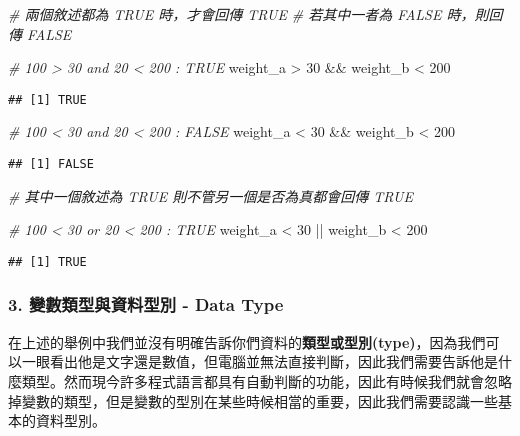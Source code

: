 \documentclass[]{article}
\newenvironment{Shaded}{\begin{snugshade}}{\end{snugshade}}
\newcommand{\DecValTok}[1]{\textcolor[rgb]{0.00,0.00,0.81}{{#1}}}
\newcommand{\StringTok}[1]{\textcolor[rgb]{0.31,0.60,0.02}{{#1}}}
\newcommand{\CommentTok}[1]{\textcolor[rgb]{0.56,0.35,0.01}{\textit{{#1}}}}
\newcommand{\NormalTok}[1]{{#1}}
\begin{document}
\begin{Shaded}
\begin{Highlighting}[]
\CommentTok{# 兩個敘述都為 TRUE 時，才會回傳 TRUE}
\CommentTok{# 若其中一者為 FALSE 時，則回傳 FALSE}

\CommentTok{# 100 > 30 and 20 < 200 : TRUE}
\NormalTok{weight_a >}\StringTok{ }\DecValTok{30} \NormalTok{&&}\StringTok{ }\NormalTok{weight_b <}\StringTok{ }\DecValTok{200}
\end{Highlighting}
\end{Shaded}

\begin{verbatim}
## [1] TRUE
\end{verbatim}

\begin{Shaded}
\begin{Highlighting}[]
\CommentTok{# 100 < 30 and 20 < 200 : FALSE}
\NormalTok{weight_a <}\StringTok{ }\DecValTok{30} \NormalTok{&&}\StringTok{ }\NormalTok{weight_b <}\StringTok{ }\DecValTok{200}
\end{Highlighting}
\end{Shaded}

\begin{verbatim}
## [1] FALSE
\end{verbatim}

\begin{Shaded}
\begin{Highlighting}[]
\CommentTok{# 其中一個敘述為 TRUE 則不管另一個是否為真都會回傳 TRUE}

\CommentTok{# 100 < 30 or 20 < 200 : TRUE}
\NormalTok{weight_a <}\StringTok{ }\DecValTok{30} \NormalTok{||}\StringTok{ }\NormalTok{weight_b <}\StringTok{ }\DecValTok{200}
\end{Highlighting}
\end{Shaded}

\begin{verbatim}
## [1] TRUE
\end{verbatim}

\subsubsection{3. 變數類型與資料型別 - Data Type}\label{---data-type}

在上述的舉例中我們並沒有明確告訴你們資料的\textbf{類型或型別(type)}，因為我們可以一眼看出他是文字還是數值，但電腦並無法直接判斷，因此我們需要告訴他是什麼類型。然而現今許多程式語言都具有自動判斷的功能，因此有時候我們就會忽略掉變數的類型，但是變數的型別在某些時候相當的重要，因此我們需要認識一些基本的資料型別。
\end{document}
